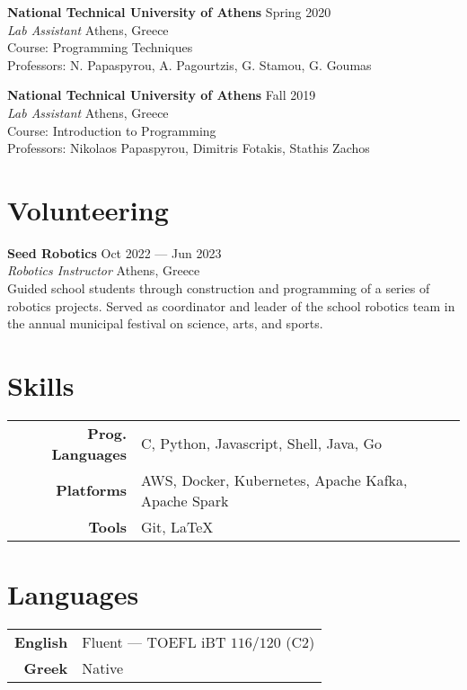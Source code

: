 \documentclass[margin, 12pt]{resume}
\newcommand{\stitle}[1]{#1:\xspace}
\newcommand{\institution}[1]{\textbf{#1}\xspace}
\newcommand{\role}[1]{\textit{#1}\xspace}
\begin{document}
\begin{resume}
    \institution{National Technical University of Athens} \hfill Spring 2020 \\
    \role{Lab Assistant} \hfill Athens, Greece \\
    \stitle{Course} Programming Techniques \\
    \stitle{Professors} N. Papaspyrou, A. Pagourtzis, G. Stamou, G. Goumas

    \institution{National Technical University of Athens} \hfill Fall 2019 \\
    \role{Lab Assistant} \hfill Athens, Greece \\
    \stitle{Course} Introduction to Programming \\
    \stitle{Professors} Nikolaos Papaspyrou, Dimitris Fotakis, Stathis Zachos

    \section{Volunteering}

    \institution{Seed Robotics} \hfill Oct 2022 --- Jun 2023 \\
    \role{Robotics Instructor} \hfill Athens, Greece \\
    Guided school students through construction and programming of a series of robotics projects. Served as coordinator and leader of the school robotics team in the annual municipal festival on science, arts, and sports.

    \section{Skills}

    \begin{tabular}{@{} >{\bfseries}r l @{}}
        Prog. Languages & C, Python, Javascript, Shell, Java, Go              \\
        Platforms       & AWS, Docker, Kubernetes, Apache Kafka, Apache Spark \\
        Tools           & Git, LaTeX
    \end{tabular}

    \section{Languages}

    \begin{tabular}{@{} >{\bfseries}r l @{}}
        English & Fluent --- TOEFL iBT \( 116/120 \) (C2) \\
        Greek   & Native                                  \\
    \end{tabular}


\end{resume}
\end{document}
